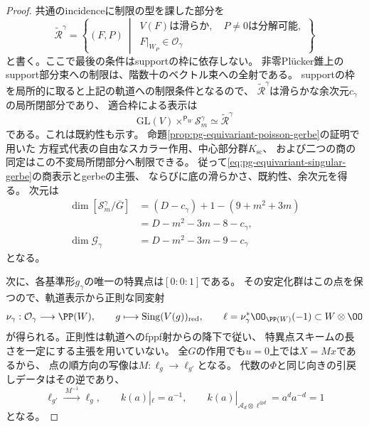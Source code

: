\begin{proof}
共通のincidenceに制限の型を課した部分を
\begin{equation}
 \widetilde{\mathscr R}^{\gamma}
 =\left\{(F,P)\ \middle|\,
 \begin{gathered}
 V(F)\text{は滑らか},\quad P\ne0\text{は分解可能},\\
 F|_{W_P}\in\mathcal O_\gamma
 \end{gathered}\right\}
 \label{eq:pg-equivariant-singular-incidence}
\end{equation}
と書く。ここで最後の条件はsupportの枠に依存しない。
非零Pl\"ucker錐上のsupport部分束への制限は、階数十のベクトル束への全射である。
supportの枠を局所的に取ると上記の軌道への制限条件となるので、
$\widetilde{\mathscr R}^{\gamma}$は滑らかな余次元$c_\gamma$の局所閉部分であり、
適合枠による表示は
\begin{equation}
 \mathrm{GL}(V)\times^{\mathsf P_W}\mathscr S_m^\gamma
 \simeq\widetilde{\mathscr R}^{\gamma}
 \label{eq:pg-equivariant-singular-associated-incidence}
\end{equation}
である。これは既約性も示す。
命題\ref{prop:pg-equivariant-poisson-gerbe}の証明で用いた
方程式代表の自由なスカラー作用、中心部分群$K_{\mathrm{sc}}$、
および二つの商の同定はこの不変局所閉部分へ制限できる。
従って\eqref{eq:pg-equivariant-singular-gerbe}の商表示とgerbeの主張、
ならびに底の滑らかさ、既約性、余次元を得る。
次元は
\begin{equation}
 \begin{aligned}
 \dim[\mathscr S_m^\gamma/\overline G]
 &=(D-c_\gamma)+1-(9+m^2+3m)\\
 &=D-m^2-3m-8-c_\gamma,\\
 \dim\mathcal G_\gamma
 &=D-m^2-3m-9-c_\gamma
 \end{aligned}
 \label{eq:pg-equivariant-singular-dimension-count}
\end{equation}
となる。

次に、各基準形$g_\gamma$の唯一の特異点は$[0:0:1]$である。
その安定化群はこの点を保つので、軌道表示から正則な同変射
\begin{equation}
 \nu_\gamma:\mathcal O_\gamma\longrightarrow\PP(W),
 \qquad g\longmapsto\operatorname{Sing}(V(g))_{\mathrm{red}},
 \qquad
 \ell=\nu_\gamma^*\OO_{\PP(W)}(-1)\subset W\otimes\OO
 \label{eq:pg-equivariant-singular-point-line}
\end{equation}
が得られる。正則性は軌道へのfppf射からの降下で従い、
特異点スキームの長さを一定にする主張を用いていない。
全$G$の作用でも$u=0$上では$X=Mx$であるから、
点の順方向の写像は$M:\ell_g\to\ell_{g'}$となる。
代数の$\Phi$と同じ向きの引戻しデータはその逆であり、
\begin{equation}
 \ell_{g'}\xrightarrow{\ M^{-1}\ }\ell_g,
 \qquad k(a)|_\ell=a^{-1},
 \qquad k(a)|_{\mathcal A_d\otimes\ell^{\otimes d}}
 =a^d a^{-d}=1
 \label{eq:pg-equivariant-singular-line-weights}
\end{equation}
となる。


\end{proof}
